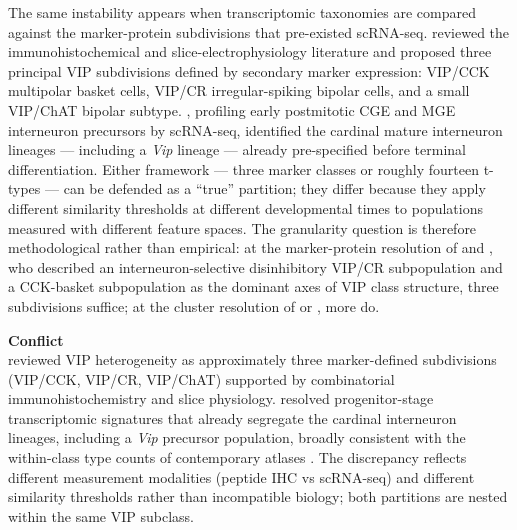 \documentclass[11pt]{article}
\begin{document}
The same instability appears when transcriptomic taxonomies are compared against the marker-protein subdivisions that pre-existed scRNA-seq. \citet{Tremblay2016} reviewed the immunohistochemical and slice-electrophysiology literature and proposed three principal VIP subdivisions defined by secondary marker expression: VIP/CCK multipolar basket cells, VIP/CR irregular-spiking bipolar cells, and a small VIP/ChAT bipolar subtype. \citet{Mayer2018}, profiling early postmitotic CGE and MGE interneuron precursors by scRNA-seq, identified the cardinal mature interneuron lineages --- including a \textit{Vip} lineage --- already pre-specified before terminal differentiation. Either framework --- three marker classes or roughly fourteen t-types --- can be defended as a ``true'' partition; they differ because they apply different similarity thresholds at different developmental times to populations measured with different feature spaces. The granularity question is therefore methodological rather than empirical: at the marker-protein resolution of \citet{Tremblay2016} and \citet{Paul2017}, who described an interneuron-selective disinhibitory VIP/CR subpopulation and a CCK-basket subpopulation as the dominant axes of VIP class structure, three subdivisions suffice; at the cluster resolution of \citet{Tasic2018} or \citet{Yao2021a}, more do.

\begin{framed}
\textbf{Conflict}\\
\citet{Tremblay2016} reviewed VIP heterogeneity as approximately three marker-defined subdivisions (VIP/CCK, VIP/CR, VIP/ChAT) supported by combinatorial immunohistochemistry and slice physiology. \citet{Mayer2018} resolved progenitor-stage transcriptomic signatures that already segregate the cardinal interneuron lineages, including a \textit{Vip} precursor population, broadly consistent with the within-class type counts of contemporary atlases \citep{Tasic2018, Yao2021a}. The discrepancy reflects different measurement modalities (peptide IHC vs scRNA-seq) and different similarity thresholds rather than incompatible biology; both partitions are nested within the same VIP subclass.
\end{framed}
\end{document}
